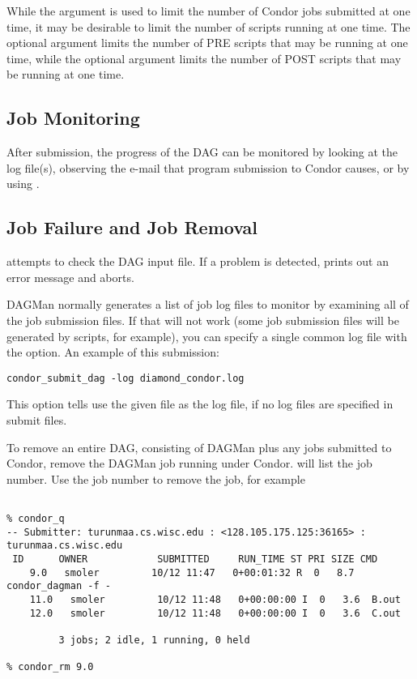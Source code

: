 While the  argument is used to limit the number
of Condor jobs submitted at one time,
it may be desirable to limit the number of scripts running
at one time.
The optional  argument limits the number of PRE
scripts that may be running at one time,
while the optional  argument limits the number of POST
scripts that may be running at one time.

\subsection{Job Monitoring}

After submission, the progress of the DAG can be monitored
by looking at the log file(s),
observing the e-mail that program submission to Condor causes,
or by using  .

\subsection{Job Failure and Job Removal}

 attempts to check the DAG input file.
If a problem is detected,
 prints out an error message and aborts.

DAGMan normally generates a list of job log files to
monitor by examining all of the job submission files.  If
that will not work (some job submission files will be generated
by  scripts, for example), you can specify a single
common log file with the  option.
An example of this submission:
\begin{verbatim}
condor_submit_dag -log diamond_condor.log
\end{verbatim}
This option tells  use the given file as
the log file, if no log files are specified in submit files.

To remove an entire DAG, consisting of DAGMan plus
any jobs submitted to Condor,
remove the DAGMan job running under Condor.
 will list the job number.
Use the job number to remove the job, for example

\footnotesize
\begin{verbatim}

% condor_q
-- Submitter: turunmaa.cs.wisc.edu : <128.105.175.125:36165> : turunmaa.cs.wisc.edu
 ID      OWNER            SUBMITTED     RUN_TIME ST PRI SIZE CMD
    9.0   smoler         10/12 11:47   0+00:01:32 R  0   8.7  condor_dagman -f -
    11.0   smoler         10/12 11:48   0+00:00:00 I  0   3.6  B.out
    12.0   smoler         10/12 11:48   0+00:00:00 I  0   3.6  C.out

         3 jobs; 2 idle, 1 running, 0 held

% condor_rm 9.0
\end{verbatim}
\normalsize

